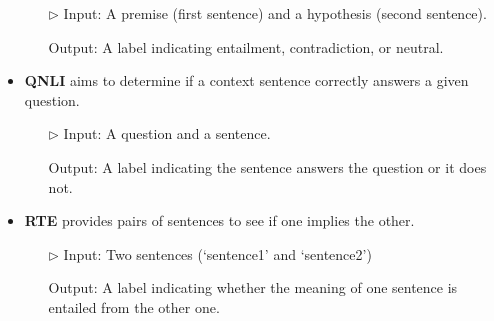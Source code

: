 \documentclass{article} %
\theoremstyle{plain}
\theoremstyle{definition}
\begin{document}
\begin{itemize}[topsep=0pt,itemsep=4pt,parsep=0pt, partopsep=0pt, leftmargin=*]
    \begin{itemize}
        \item[$\rhd$] Input: A premise (first sentence) and a hypothesis (second sentence). 
        \item[\ding{73}] Output: A label indicating entailment, contradiction, or neutral.
    \end{itemize}
    \item \textbf{QNLI} aims to determine if a context sentence correctly answers a given question. 
    \begin{itemize}
        \item[$\rhd$] Input: A question and a sentence.  
        \item[\ding{73}] Output: A label indicating the sentence answers the question or it does not.
    \end{itemize}
    \item \textbf{RTE} provides pairs of sentences to see if one implies the other. 
    \begin{itemize}
        \item[$\rhd$] Input: Two sentences (`sentence1' and `sentence2')
        \item[\ding{73}] Output: A label indicating whether the meaning of one sentence is entailed from the other one.
    \end{itemize}
\end{itemize}

\end{document}
